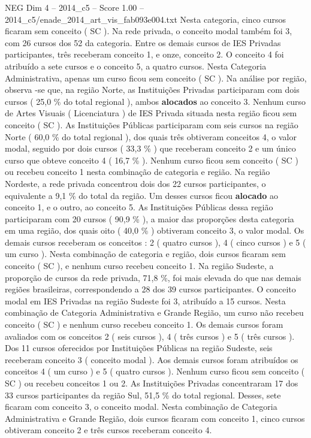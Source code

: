 \begin{textsample}{NEG Dim 4 – 2014\_c5 – Score 1.00 – 2014\_c5/enade\_2014\_art\_vis\_fab093e004.txt}
Nesta categoria, cinco cursos ficaram sem conceito ( SC ).
Na rede privada, o conceito modal também foi 3, com 26 cursos dos 52 da categoria.
Entre os demais cursos de IES Privadas participantes, três receberam conceito 1, e onze, conceito 2.
O conceito 4 foi atribuído a sete cursos e o conceito 5, a quatro cursos.
Nesta Categoria Administrativa, apenas um curso ficou sem conceito ( SC ).
Na análise por região, observa -se que, na região Norte, as Instituições Privadas participaram com dois cursos ( 25,0 \% do total regional ), ambos \textbf{alocados} ao conceito 3.
Nenhum curso de Artes Visuais ( Licenciatura ) de IES Privada situada nesta região ficou sem conceito ( SC ).
As Instituições Públicas participaram com seis cursos na região Norte ( 60,0 \% do total regional ), dos quais três obtiveram conceitos 4, o valor modal, seguido por dois cursos ( 33,3 \% ) que receberam conceito 2 e um único curso que obteve conceito 4 ( 16,7 \% ).
Nenhum curso ficou sem conceito ( SC ) ou recebeu conceito 1 nesta combinação de categoria e região.
Na região Nordeste, a rede privada concentrou dois dos 22 cursos participantes, o equivalente a 9,1 \% do total da região.
Um desses cursos ficou \textbf{alocado} ao conceito 1, e o outro, ao conceito 5.
As Instituições Públicas dessa região participaram com 20 cursos ( 90,9 \% ), a maior das proporções desta categoria em uma região, dos quais oito ( 40,0 \% ) obtiveram conceito 3, o valor modal.
Os demais cursos receberam os conceitos : 2 ( quatro cursos ), 4 ( cinco cursos ) e 5 ( um curso ).
Nesta combinação de categoria e região, dois cursos ficaram sem conceito ( SC ), e nenhum curso recebeu conceito 1.
Na região Sudeste, a proporção de cursos da rede privada, 71,8 \%, foi mais elevada do que nas demais regiões brasileiras, correspondendo a 28 dos 39 cursos participantes.
O conceito modal em IES Privadas na região Sudeste foi 3, atribuído a 15 cursos.
Nesta combinação de Categoria Administrativa e Grande Região, um curso não recebeu conceito ( SC ) e nenhum curso recebeu conceito 1.
Os demais cursos foram avaliados com os conceitos 2 ( seis cursos ), 4 ( três cursos ) e 5 ( três cursos ).
Dos 11 cursos oferecidos por Instituições Públicas na região Sudeste, seis receberam conceito 3 ( conceito modal ).
Aos demais cursos foram atribuídos os conceitos 4 ( um curso ) e 5 ( quatro cursos ).
Nenhum curso ficou sem conceito ( SC ) ou recebeu conceitos 1 ou 2.
As Instituições Privadas concentraram 17 dos 33 cursos participantes da região Sul, 51,5 \% do total regional.
Desses, sete ficaram com conceito 3, o conceito modal.
Nesta combinação de Categoria Administrativa e Grande Região, dois cursos ficaram com conceito 1, cinco cursos obtiveram conceito 2 e três cursos receberam conceito 4.

\end{textsample}
